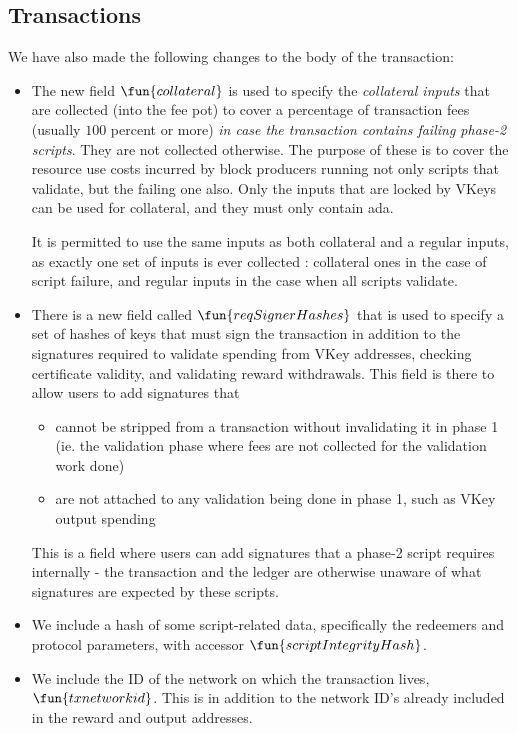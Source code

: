 \subsection{Transactions}
\label{sec:transctions}
We have also made the following changes to
the body of the transaction:

\begin{itemize}
  \item The new field $\fun{collateral}$ is used to specify the \emph{collateral inputs}
    that are collected (into the fee pot) to cover a percentage of
    transaction fees (usually $100$ percent or more)
    \emph{in case the transaction contains failing phase-2 scripts}. They are not collected otherwise.
    The purpose of these is to cover the resource use costs incurred by block producers running not only
    scripts that validate, but the failing one also. Only the inputs that are locked by VKeys can
    be used for collateral, and they must only contain ada.

    It is permitted to use the same inputs as both collateral and a regular inputs, as exactly
    one set of inputs is ever collected : collateral ones in the case of script failure, and regular inputs
    in the case when all scripts validate.

  \item There is a new field called $\fun{reqSignerHashes}$ that is used to specify a set of hashes
  of keys that must sign the transaction in addition to the signatures required to validate
  spending from VKey addresses, checking certificate validity, and validating reward withdrawals.
  This field is there to allow users to add signatures that
  \begin{itemize}
    \item cannot be stripped from a transaction without invalidating it in phase 1 (ie. the
    validation phase where fees are not collected for the validation work done)
    \item are not attached to any validation being done in phase 1, such as VKey output spending
  \end{itemize}

  This is a field where users can add signatures that a phase-2 script requires internally -
  the transaction and the ledger are otherwise unaware of what signatures are expected by these scripts.

  \item We include a hash of some script-related data, specifically the redeemers and protocol parameters,
    with accessor $\fun{scriptIntegrityHash}$.

  \item We include the ID of the network on which the transaction lives, $\fun{txnetworkid}$.
  This is in addition to the network ID's already included in the reward and output addresses.
\end{itemize}

